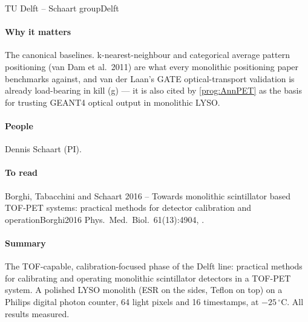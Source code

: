 \begin{programnote}{TU Delft -- Schaart group}{Delft}
 
 
\paragraph{Why it matters}
The canonical baselines. k-nearest-neighbour and categorical average pattern
positioning (van Dam et al.\ 2011) are what every monolithic positioning paper
benchmarks against, and van der Laan's GATE optical-transport validation is
already load-bearing in kill (g) --- it is also cited by \ref{prog:AnnPET} as
the basis for trusting GEANT4 optical output in monolithic LYSO.
 
\paragraph{People}
Dennis Schaart (PI). 
 
\paragraph{To read}
 
\begin{papernote}{Borghi, Tabacchini and Schaart 2016 -- Towards monolithic scintillator based TOF-PET systems: practical methods for detector calibration and operation}{Borghi2016}
Phys.\ Med.\ Biol.\ 61(13):4904, .

\paragraph{Summary}
The TOF-capable, calibration-focused phase of the Delft line: practical
methods for calibrating and operating monolithic scintillator detectors in a
TOF-PET system. A  polished LYSO monolith (ESR on
the sides, Teflon on top) on a Philips digital photon counter, 64 light pixels
and 16 timestamps, at $-25\,^\circ$C. All results measured.


\end{papernote}
\end{programnote}

